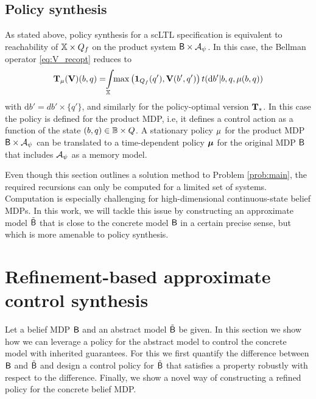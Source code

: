 \documentclass{ifacconf}
\begin{document}
\subsection{Policy synthesis}

As stated above, policy synthesis for a scLTL specification is equivalent to reachability of ${\mathbb{X}} \times Q_f$ on the product system $\mathsf{B} \times \mathcal{A}_\psi$. In this case, the Bellman operator \eqref{eq:V_recopt} reduces to 
\begin{equation}
\label{eq:V_recopt_inf_mu}
\begin{aligned}
  \Bel_\pol (\mathbf V)(b,q) = \hspace{-1mm} \int_{\X} \hspace{-1mm} \max \left( \mathbf 1_{Q_f}(q'), \mathbf V( b', q') \right) {\tr}(\mathrm{d} b' |b,q,\pol(b,q))
\end{aligned}
\end{equation}
with $\mathrm{d} b'= d b'\times\{q'\}$, and similarly for the policy-optimal version ${\mathbf {T}}_\ast$. In this case the policy is defined for the product MDP, i.e, it defines a control action as a function of the state $(b,q) \in \mathbb{B} \times Q$. A stationary policy ${\mu}$ for the product MDP $\mathsf{B} \times \mathcal{A}_\psi$ can be translated to a time-dependent policy ${\boldsymbol{\mu}}$ for the original MDP $\mathsf{B}$ that includes $\mathcal{A}_\psi$ as a memory model.

Even though this section outlines a solution method to Problem \ref{prob:main}, the required recursions can only be computed for a limited set of systems.
Computation is especially challenging for high-dimensional continuous-state belief MDPs. In this work, we will tackle this issue by constructing an approximate model $\tilde {\mathsf{B}}$ that is close to the concrete model $\mathsf{B}$ in a certain precise sense, but which is more amenable to policy synthesis. 


\section{Refinement-based approximate control synthesis} 
\label{sec:refinement}

Let a belief MDP $\mathsf{B}$ and an abstract model $\tilde {\mathsf{B}}$ be given. In this section we show how we can leverage a policy for the abstract model to control the concrete model with inherited guarantees. For this we first quantify the difference between $\mathsf{B}$ and $\tilde {\mathsf{B}}$ and design a control policy for $\tilde {\mathsf{B}}$ that satisfies a property robustly with respect to the difference. Finally, we show a novel way of constructing a refined policy for the concrete belief MDP. 
\end{document}
